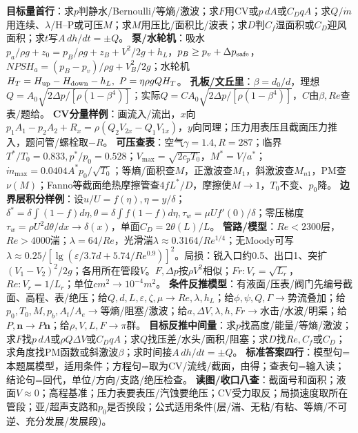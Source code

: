 {\fontsize{4.35}{4.45}\selectfont
\textbf{目标量首行}：求$p$判静水/Bernoulli/等熵/激波；求$F$用CV或$p\,dA$或$C_DqA$；求$Q/\dot m$用连续、$\lambda$/H--P或可压$M$；求$M$用压比/面积比/波表；求$D$判$C_f$湿面积或$C_D$迎风面积；求$t$写$A\,dh/dt=\pm Q$。 
\textbf{泵/水轮机}：吸水$p_a/\rho g+z_0=p_B/\rho g+z_B+V^2/2g+h_L$，$p_B\ge p_v+\Delta p_{\rm safe}$，$NPSH_a=(p_B-p_v)/\rho g+V_B^2/2g$；水轮机$H_T=H_{\rm up}-H_{\rm down}-h_L,\ P=\eta\rho gQH_T$。 
\textbf{孔板/文丘里}：$\beta=d_0/d$，理想$Q=A_0\sqrt{2\Delta p/[\rho(1-\beta^4)]}$；实际$Q=C A_0\sqrt{2\Delta p/[\rho(1-\beta^4)]}$，$C$由$\beta,Re$查表/题给。 
\textbf{CV分量样例}：画流入/流出，$x$向$p_1A_1-p_2A_2+R_x=\rho(Q_2V_{2x}-Q_1V_{1x})$，$y$向同理；压力用表压且截面压力推入，题问管/螺栓取$-R$。 
\textbf{可压查表}：空气$\gamma=1.4,R=287$；临界$T^*/T_0=0.833,p^*/p_0=0.528$；$V_{\max}=\sqrt{2c_pT_0}$，$M^*=V/a^*$；$\dot m_{\max}=0.0404A^*p_0/\sqrt{T_0}$；等熵/面积查$M$，正激波查$M_1$，斜激波查$M_{n1}$，PM查$\nu(M)$；Fanno等截面绝热摩擦管查$4fL^*/D$，摩擦使$M\to1$，$T_0$不变、$p_0$降。 
\textbf{边界层积分样例}：设$u/U=f(\eta),\eta=y/\delta$；$\delta^*=\delta\int(1-f)d\eta,\theta=\delta\int f(1-f)d\eta,\tau_w=\mu Uf'(0)/\delta$；零压梯度$\tau_w=\rho U^2d\theta/dx\to\delta(x)$，单面$C_D=2\theta(L)/L$。 
\textbf{管路/模型}：$Re<2300$层，$Re>4000$湍；$\lambda=64/Re$，光滑湍$\lambda\approx0.3164/Re^{1/4}$；无Moody可写$\lambda\approx0.25/[\lg(\varepsilon/3.7d+5.74/Re^{0.9})]^2$。局损：锐入口约0.5、出口1、突扩$(V_1-V_2)^2/2g$；各用所在管段$V$。$F,\Delta p$按$\rho V^2$相似；$Fr:V_r=\sqrt{L_r}$，$Re:V_r=1/L_r$；单位$cm^2\to10^{-4}m^2$。}
{\fontsize{4.43}{4.53}\selectfont
\textbf{条件反推模型}：有液面/压表/阀门先编号截面、高程、表/绝压；给$Q,d,L,\varepsilon,\zeta,\mu\to Re,\lambda,h_L$；给$\phi,\psi,Q,\Gamma\to$势流叠加；给$p_0,T_0,M,p_b,A_t/A_e\to$等熵/阻塞/激波；给$a,\Delta V,\lambda,h,Fr\to$水击/水波/明渠；给$P,\bm n\to P\bm n$；给$\rho,V,L,F\to\pi$群。 
\textbf{目标反推中间量}：求$p$找高度/能量/等熵/激波；求$F$找$p\,dA$或$\rho Q\Delta V$或$C_DqA$；求$Q$找压差/水头/面积/阻塞；求$D$找$Re,C_f$或$C_D$；求角度找PM函数或斜激波$\beta$；求时间接$A\,dh/dt=\pm Q$。 
\textbf{标准答案四行}：模型句=本题属\underline{\hspace{0.45cm}}模型，适用条件\underline{\hspace{0.45cm}}；方程句=取\underline{\hspace{0.4cm}}为CV/流线/截面，由\underline{\hspace{0.55cm}}得；查表句=输入\underline{\hspace{0.45cm}}读\underline{\hspace{0.45cm}}；结论句=回代，单位/方向/支路/绝压检查。 
\textbf{读图/收口八查}：截面号和面积；液面$V\approx0$；高程基准；压力表要表压/汽蚀要绝压；CV受力取反；局损速度取所在管段；亚/超声支路和$p_0$是否换段；公式适用条件(层/湍、无粘/有粘、等熵/不可逆、充分发展/发展段)。}
